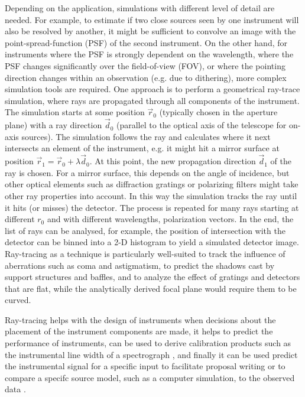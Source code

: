 \documentclass[twocolumn]{aastex61}
\begin{document}
Depending on the application, simulations with different level of detail are
needed. For example, to estimate if two close sources seen by one instrument
will also be resolved by another, it might be sufficient to convolve an image
with the point-spread-function (PSF) of the second instrument. On the other
hand, for instruments where the PSF is strongly dependent on the wavelength,
where the PSF changes significantly over the field-of-view (FOV), or where the
pointing direction changes within an observation (e.g. due to dithering), more
complex simulation tools are required. One approach is to perform a geometrical
ray-trace simulation, where rays are propagated through all components of the
instrument. The simulation starts at some position $\vec r_0$ (typically chosen
in the aperture plane) with a ray direction $\vec d_0$ (parallel to the optical
axis of the telescope for on-axis sources). The simulation follows the ray and
calculates where it next intersects an element of the instrument, e.g. it might
hit a mirror surface at position $\vec r_1 = \vec r_0 + \lambda \vec d_0$. At
this point, the new propagation direction $\vec d_1$ of the ray is chosen. For
a mirror surface, this depends on the angle of incidence, but other optical
elements such as diffraction gratings or polarizing filters might take other
ray properties into account. In this way the simulation tracks the ray until it
hits (or misses) the detector. The process is repeated for many rays starting
at different $r_0$ and with different wavelengths, polarization vectors. In the
end, the list of rays can be analysed, for example, the position of
intersection with the detector can be binned into a 2-D histogram to yield a
simulated detector image. Ray-tracing as a technique is particularly
well-suited to track the influence of aberrations such as coma and astigmatism,
to predict the shadows cast by support structures and baffles, and to analyze
the effect of gratings and detectors that are flat, while the analytically
derived focal plane would require them to be curved.

Ray-tracing helps with the design of instruments
\citep[e.g.][]{doi:10.1117/12.2055183} when decisions about the placement of
the instrument components are made, it helps to predict the performance of
instruments, can be used to derive calibration products such as the
instrumental line width of a spectrograph \citep{doi:10.1117/12.409156}, and
finally it can be used predict the instrumental signal for a specific input to
facilitate proposal writing or to compare a specifc source model, such as a
computer simulation, to the observed data \citep[e.g.][]{2009ApJ...699.1004Z}.
\end{document}
